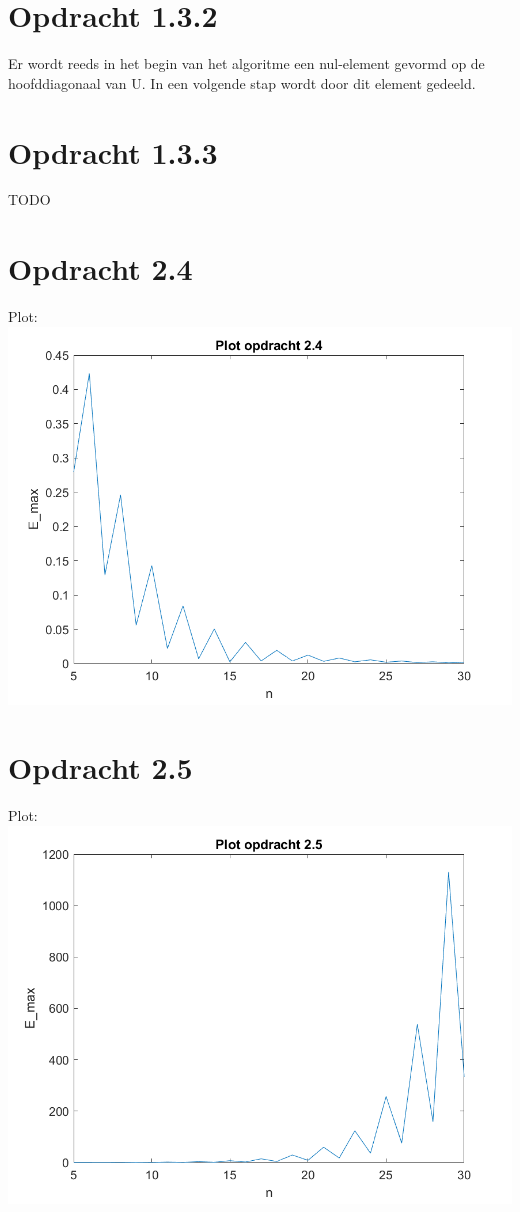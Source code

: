 \documentclass[a4paper]{article}
\begin{document}
\section*{Opdracht 1.3.2}
Er wordt reeds in het begin van het algoritme een nul-element gevormd op de hoofddiagonaal van U. In een volgende stap wordt door dit element gedeeld.
\section*{Opdracht 1.3.3}
TODO
\section*{Opdracht 2.4}
Plot:
\\{}
\includegraphics[scale = 0.8]{plot2_4}
\section*{Opdracht 2.5}
Plot:
\\{}
\includegraphics[scale = 0.8]{plot2_5}
\end{document}
